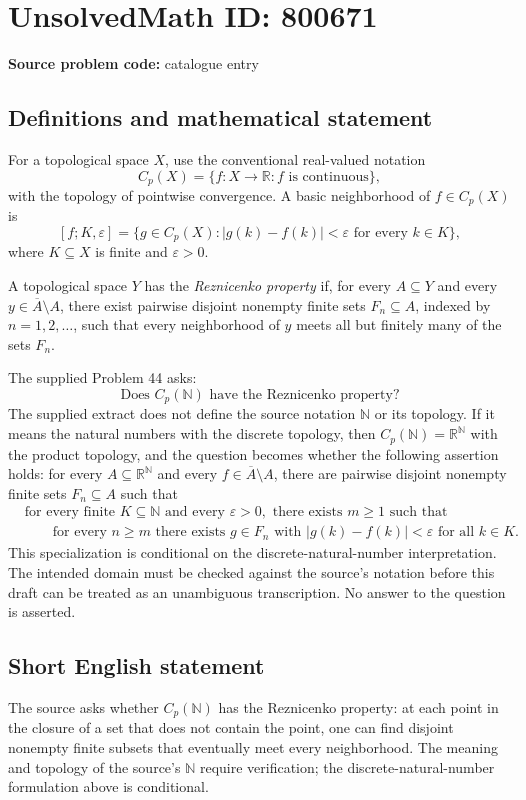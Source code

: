 \documentclass[11pt]{article}
\newcommand{\R}{\mathbb{R}}
\begin{document}
\section*{UnsolvedMath ID: 800671}
\textbf{Source problem code:} catalogue entry
\subsection{Definitions and mathematical statement}
For a topological space \(X\), use the conventional real-valued notation
\[
C_p(X)=\{f:X\to\R:f\text{ is continuous}\},
\]
with the topology of pointwise convergence. A basic neighborhood of \(f\in C_p(X)\) is
\[
[f;K,\varepsilon]=\{g\in C_p(X):|g(k)-f(k)|<\varepsilon\text{ for every }k\in K\},
\]
where \(K\subseteq X\) is finite and \(\varepsilon>0\).

A topological space \(Y\) has the \emph{Reznicenko property} if, for every \(A\subseteq Y\) and every \(y\in\overline A\setminus A\), there exist pairwise disjoint nonempty finite sets \(F_n\subseteq A\), indexed by \(n=1,2,\ldots\), such that every neighborhood of \(y\) meets all but finitely many of the sets \(F_n\).

The supplied Problem 44 asks:
\[
\text{Does }C_p(\mathbb{N})\text{ have the Reznicenko property?}
\]
The supplied extract does not define the source notation \(\mathbb{N}\) or its topology. If it means the natural numbers with the discrete topology, then \(C_p(\mathbb{N})=\R^{\mathbb{N}}\) with the product topology, and the question becomes whether the following assertion holds: for every \(A\subseteq\R^{\mathbb{N}}\) and every \(f\in\overline A\setminus A\), there are pairwise disjoint nonempty finite sets \(F_n\subseteq A\) such that
\[
\begin{split}
&\text{for every finite }K\subseteq\mathbb{N}\text{ and every }\varepsilon>0,
\text{ there exists }m\geq1\text{ such that}\\
&\qquad\text{for every }n\geq m\text{ there exists }g\in F_n
\text{ with }|g(k)-f(k)|<\varepsilon\text{ for all }k\in K.
\end{split}
\]
This specialization is conditional on the discrete-natural-number interpretation. The intended domain must be checked against the source's notation before this draft can be treated as an unambiguous transcription. No answer to the question is asserted.
\subsection{Short English statement}
The source asks whether \(C_p(\mathbb{N})\) has the Reznicenko property: at each point in the closure of a set that does not contain the point, one can find disjoint nonempty finite subsets that eventually meet every neighborhood. The meaning and topology of the source's \(\mathbb{N}\) require verification; the discrete-natural-number formulation above is conditional.
\end{document}
